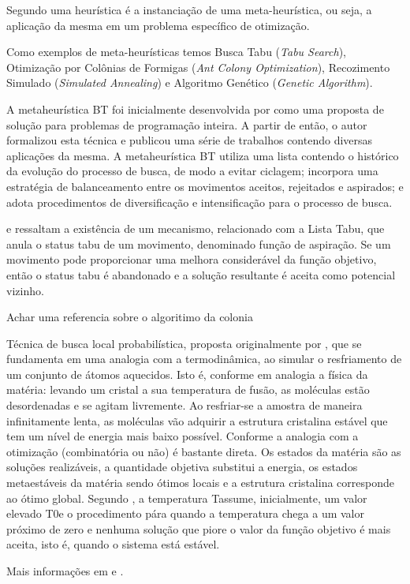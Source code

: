 Segundo \cite{adrianocesar} uma heurística é a instanciação de uma meta-heurística, ou seja, a aplicação da mesma em um problema específico de otimização.\par

Como exemplos de meta-heurísticas temos Busca Tabu (\textit{Tabu Search}), Otimização por Colônias de Formigas (\textit{Ant Colony Optimization}), Recozimento Simulado (\textit{Simulated Annealing}) e Algoritmo Genético (\textit{Genetic Algorithm}).\par


A metaheurística BT foi inicialmente desenvolvida por \cite{glover1986future} como uma proposta de
solução para problemas de programação inteira. A partir de então, o autor formalizou esta
técnica e publicou uma série de trabalhos contendo diversas aplicações da mesma. A
metaheurística BT utiliza uma lista contendo o histórico da evolução do processo de busca, de
modo a evitar ciclagem; incorpora uma estratégia de balanceamento entre os movimentos
aceitos, rejeitados e aspirados; e adota procedimentos de diversificação e intensificação para o
processo de busca.\par
\cite{souza2000} e \cite{white2004using} ressaltam a existência de um mecanismo, relacionado com
a Lista Tabu, que anula o status tabu de um movimento, denominado função de aspiração. Se
um movimento pode proporcionar uma melhora considerável da função objetivo, então o
status tabu é abandonado e a solução resultante é aceita como potencial vizinho.


	Achar uma referencia sobre o algoritimo da colonia


Técnica de busca local probabilística, proposta originalmente por \cite{kirkpatrick1983optimization}, que se fundamenta em uma analogia com a termodinâmica, ao simular o 
resfriamento de um conjunto de átomos aquecidos. Isto é, conforme \cite{noronha2003abordagem} em 
analogia a física da matéria: levando um cristal a sua temperatura de fusão, as moléculas 
estão desordenadas e se agitam livremente. Ao resfriar-se a amostra de maneira 
infinitamente lenta, as moléculas vão adquirir a estrutura cristalina estável que tem um 
nível de energia mais baixo possível. 
Conforme \cite{aarts1988simulated} a analogia com a otimização (combinatória ou não) 
é bastante direta. Os estados da matéria são as soluções realizáveis, a quantidade objetiva 
substitui a energia, os estados metaestáveis da matéria sendo ótimos locais e a estrutura 
cristalina corresponde ao ótimo global. 
Segundo \cite{reeves1993modern}, a temperatura Tassume, inicialmente, um valor 
elevado T0e o procedimento pára quando a temperatura chega a um valor próximo de zero 
e nenhuma solução que piore o valor da função objetivo é mais aceita, isto é, quando o 
sistema está estável.\par
Mais informações em \cite{reeves1993modern} e \cite{kirkpatrick1983optimization}. 

